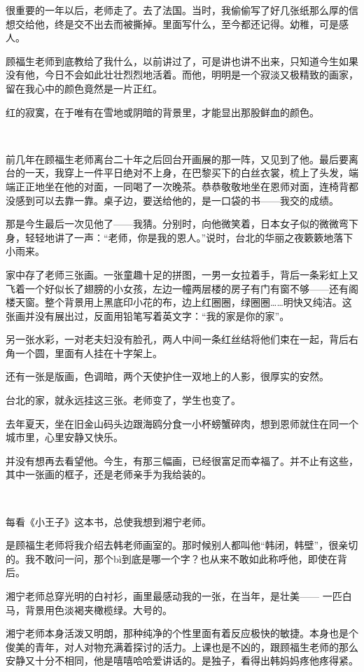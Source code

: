 \par 很重要的一年以后，老师走了。去了法国。当时，我偷偷写了好几张纸那么厚的信想交给他，终是交不出去而被撕掉。里面写什么，至今都还记得。幼稚，可是感人。
\par 顾福生老师到底教给了我什么，以前讲过了，可是讲也讲不出来，只知道今生如果没有他，今日不会如此壮壮烈烈地活着。而他，明明是一个寂淡又极精致的画家，留在我心中的颜色竟然是一片正红。
\par 红的寂寞，在于唯有在雪地或阴暗的背景里，才能显出那股鲜血的颜色。
\par  
\par 前几年在顾福生老师离台二十年之后回台开画展的那一阵，又见到了他。最后要离台的一天，我穿上一件平日绝对不上身，在巴黎买下的白丝衣裳，梳上了头发，端端正正地坐在他的对面，一同喝了一次晚茶。恭恭敬敬地坐在恩师对面，连椅背都没感到可以去靠一靠。桌子边，要送给他的，是一口袋的书——我交的成绩。
\par 那是今生最后一次见他了——我猜。分别时，向他微笑着，日本女子似的微微弯下身，轻轻地讲了一声：“老师，你是我的恩人。”说时，台北的华丽之夜簌簌地落下小雨来。
\par 家中存了老师三张画。一张童趣十足的拼图，一男一女拉着手，背后一条彩虹上又飞着一个好似长了翅膀的小女孩，左边一幢两层楼的房子有门有窗不够——还有阁楼天窗。整个背景用上黑底印小花的布，边上红圈圈，绿圈圈……明快又纯洁。这张画并没有展出过，反面用铅笔写着英文字：“我的家是你的家”。
\par 另一张水彩，一对老夫妇没有脸孔，两人中间一条红丝结将他们束在一起，背后右角一个圆，里面有人挂在十字架上。
\par 还有一张是版画，色调暗，两个天使护住一双地上的人影，很厚实的安然。
\par 台北的家，就永远挂这三张。老师变了，学生也变了。
\par 去年夏天，坐在旧金山码头边跟海鸥分食一小杯螃蟹碎肉，想到恩师就住在同一个城市里，心里安静又快乐。
\par 并没有想再去看望他。今生，有那三幅画，已经很富足而幸福了。并不止有这些，其中一张画的框子，还是老师亲手为我给装的。
\par  
\par 每看《小王子》这本书，总使我想到湘宁老师。
\par 是顾福生老师将我介绍去韩老师画室的。那时候别人都叫他“韩闭，韩壁”，很亲切的。我不敢问一问，那个bì到底是哪一个字？也从来不敢如此称呼他，即使在背后。
\par 湘宁老师总穿光明的白衬衫，画里最感动我的一张，在当年，是壮美—— 一匹白马，背景用色淡褐夹橄榄绿。大号的。
\par 湘宁老师本身活泼又明朗，那种纯净的个性里面有着反应极快的敏捷。本身也是个俊美的青年，对人对物充满着探讨的活力。上课也是不凶的，跟顾福生老师的那么安静又十分不相同，他是嘻嘻哈哈爱讲话的。是独子，看得出韩妈妈疼他疼得紧。
